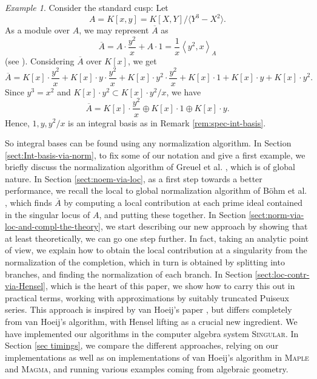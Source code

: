 \documentclass[a4paper,11pt]{amsart}%
\theoremstyle{definition}
\theoremstyle{plain}
\theoremstyle{remark}
\newtheorem{example}[defn]{Example}
\begin{document}
\begin{example}
\label{exampleCusp} Consider the standard cusp: Let
\[
A=K[x,y]=K[X,Y]/\langle Y^{3}-X^{2}\rangle.
\]
As a module over $A$, we may represent $\overline{A}$ as
\[
\overline{A}=A \cdot\frac{y^{2}}{x}+A \cdot1 = \frac{1}{x}\left\langle y^{2},
x\right\rangle _{A}%
\]
(see \cite[Example 2.5]{GLS10}). Considering $\overline{A}$ over $K[x]$, we
get
\[
\overline{A}=K[x]\cdot\frac{y^{2}}{x}+K[x]\cdot y\cdot\frac{y^{2}}%
{x}+K[x]\cdot y^{2}\cdot\frac{y^{2}}{x}+K[x]\cdot1+K[x]\cdot y+K[x]\cdot
y^{2}.
\]
Since $y^{3}=x^{2}$ and $K[x]\cdot y^{2}\subset K[x]\cdot y^{2}/x$, we have
\[
\overline{A}=K[x]\cdot\frac{y^{2}}{x} \oplus K[x]\cdot1\oplus K[x]\cdot y.
\]
Hence, $1,y,y^{2}/x$ is an integral basis as in Remark
\ref{rem:spec-int-basis}.
\end{example}




So integral bases can be found using any normalization algorithm. In Section
\ref{sect:Int-basis-via-norm}, to fix some of our notation and give a first
example, we briefly discuss the normalization algorithm of Greuel et al.
\cite{GLS10}, which is of global nature. In Section \ref{sect:noem-via-loc},
as a first step towards a better performance, we recall the local to global
normalization algorithm of B\"ohm et al. \cite{BDLPSS}, which finds
$\overline{A}$ by computing a local contribution at each prime ideal contained
in the singular locus of $A$, and putting these together. In Section
\ref{sect:norm-via-loc-and-compl-the-theory}, we start describing our new
approach by showing that at least theoretically, we can go one step further.
In fact, taking an analytic point of view, we explain how to obtain the local
contribution at a singularity from the normalization of the completion, which
in turn is obtained by splitting into branches, and finding the normalization
of each branch. In Section \ref{sect:loc-contr-via-Hensel}, which is the heart
of this paper, we show how to carry this out in practical terms, working with
approximations by suitably truncated Puiseux series. This approach is inspired
by van Hoeij's paper \cite{vanHoeij94}, but differs completely from van
Hoeij's algorithm, with Hensel lifting as a crucial new ingredient. We have
implemented our algorithms in the computer algebra system \textsc{Singular}{}.
In Section \ref{sec timings}, we compare the different approaches, relying on
our implementations as well as on implementations of van Hoeij's algorithm in
\textsc{Maple} and \textsc{Magma}, and running various examples coming from
algebraic geometry.
\end{document}
